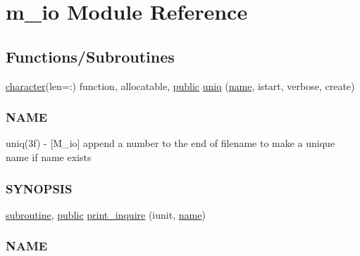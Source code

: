\hypertarget{namespacem__io}{}\section{m\+\_\+io Module Reference}
\label{namespacem__io}
\subsection*{Functions/\+Subroutines}
\begin{DoxyCompactItemize}
\item 
\hyperlink{option__stopwatch_83_8txt_abd4b21fbbd175834027b5224bfe97e66}{character}(len=\+:) function, allocatable, \hyperlink{M__stopwatch_83_8txt_a2f74811300c361e53b430611a7d1769f}{public} \hyperlink{namespacem__io_adf7b5088ef3b4daa6c064d3e264ae821}{uniq} (\hyperlink{M__stopwatch_83_8txt_a3f508a893ae4c3b397b4383e33b9bcae}{name}, istart, verbose, create)
\begin{DoxyCompactList}\small\item\em \subsubsection*{N\+A\+ME}

uniq(3f) -\/ \mbox{[}M\+\_\+io\mbox{]} append a number to the end of filename to make a unique name if name exists \subsubsection*{S\+Y\+N\+O\+P\+S\+IS}\end{DoxyCompactList}\item 
\hyperlink{M__stopwatch_83_8txt_acfbcff50169d691ff02d4a123ed70482}{subroutine}, \hyperlink{M__stopwatch_83_8txt_a2f74811300c361e53b430611a7d1769f}{public} \hyperlink{namespacem__io_aa6ee277b2e0f1c263488624b34371fcf}{print\+\_\+inquire} (iunit, \hyperlink{M__stopwatch_83_8txt_a3f508a893ae4c3b397b4383e33b9bcae}{name})
\begin{DoxyCompactList}\small\item\em \subsubsection*{N\+A\+ME}


\end{DoxyCompactList}
\end{DoxyCompactItemize}
